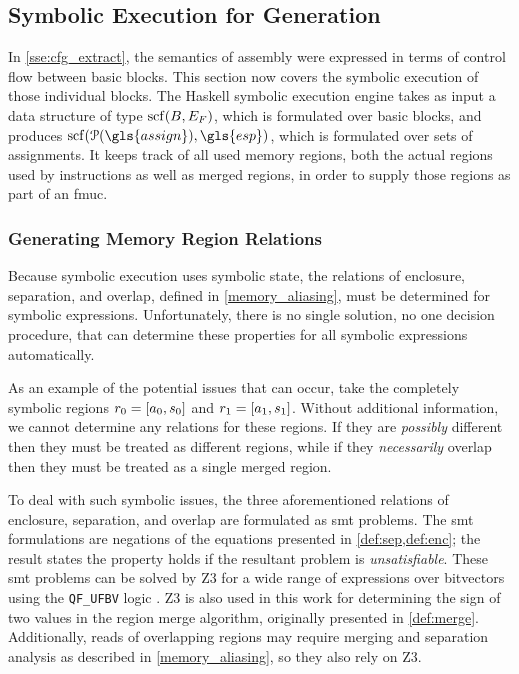 \subsection{Symbolic Execution for Generation}\label{sse:syntax_symb}
In \cref{sse:cfg_extract}, the semantics of assembly were expressed%
in terms of control flow between basic blocks.
This section now covers the symbolic execution of those individual blocks.
The Haskell symbolic execution engine
takes as input a data structure of type $\operatorname{scf}(B,E_F)$,
which is formulated over basic blocks,
and produces $\scf(\powerset(\gls{assign}),\gls{esp})$,
which is formulated over sets of assignments.
It keeps track of all used memory regions,
both the actual regions used by instructions as well as merged regions,
in order to supply those regions as part of an \ac{fmuc}.

\subsubsection{Generating Memory Region Relations}
Because symbolic execution uses symbolic state,
the relations of enclosure, separation, and overlap,
defined in \cref{memory_aliasing}, must be determined for symbolic expressions.
Unfortunately, there is no single solution, no one decision procedure,
that can determine these properties for all symbolic expressions automatically.

As an example of the potential issues that can occur,
take the completely symbolic regions $r_0=[a_0,s_0]$
and $r_1=[a_1,s_1]$.
Without additional information, we cannot determine any relations for these regions.
If they are \emph{possibly} different then they must be treated as different regions,
while if they \emph{necessarily} overlap
then they must be treated as a single merged region.

To deal with such symbolic issues,
the three aforementioned relations of enclosure, separation, and overlap
are formulated as \ac{smt} problems.
The \ac{smt} formulations are negations
of the equations presented in \cref{def:sep,def:enc};
the result states the property holds if the resultant problem is \emph{unsatisfiable}.
These \ac{smt} problems can be solved by Z3 \autocite{de2008z3}
for a wide range of expressions over bitvectors
using the \lstinline|QF_UFBV| logic \autocite{smtlib:bitvector-logic,smtlib:bitvector-theory}.
Z3 is also used in this work for determining the sign of two values
in the region merge algorithm, originally presented in \cref{def:merge}.
Additionally, reads of overlapping regions may require merging
and separation analysis as described in \cref{memory_aliasing},
so they also rely on Z3.


